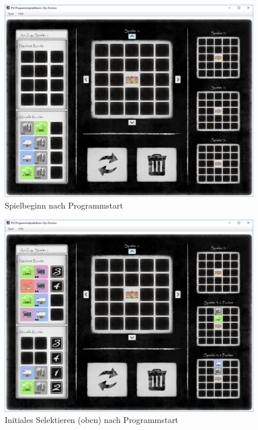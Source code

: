 \begin{figure}
	\centering
	\includegraphics{screenshots/screenshot_Spielbeginn.png}
	\caption[Spielbeginn]{Spielbeginn nach Programmstart}
	\label{fig:spielbeginnGui}
\end{figure}


\begin{figure}
	\centering
	\includegraphics{screenshots/screenshot_InitialesSelektieren2.png}
	\caption[Initiales Selektieren - oben]{Initiales Selektieren (oben) nach Programmstart}
	\label{fig:initialesSelektierenOben}
\end{figure}


